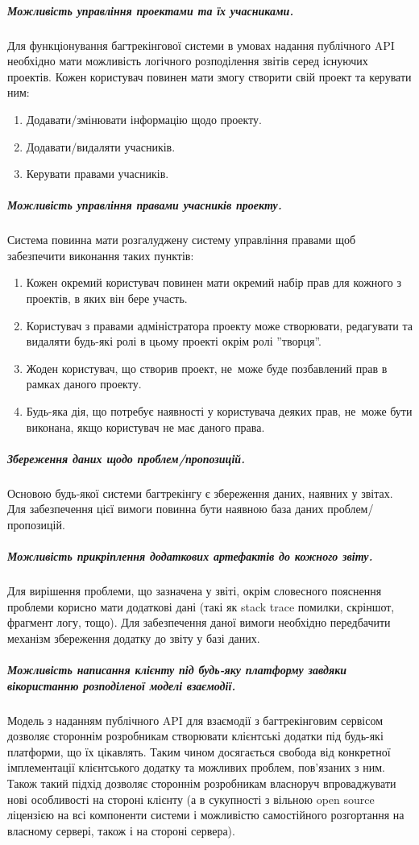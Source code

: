 \documentclass[../main.tex]{subfiles}
\begin{document}
	\subparagraph{Можливість управління проектами та їх учасниками.}
		Для функціонування багтрекінгової системи в умовах надання публічного API необхідно мати можливість логічного розподілення звітів серед існуючих проектів. Кожен користувач повинен мати змогу створити свій проект та керувати ним:
		\begin{enumerate}
			\item Додавати/змінювати інформацію щодо проекту.
			\item Додавати/видаляти учасників.
			\item Керувати правами учасників.
		\end{enumerate}
	
	\subparagraph{Можливість управління правами учасників проекту.}
		Система повинна мати розгалуджену систему управління правами щоб забезпечити виконання таких пунктів:
		\begin{enumerate}
			\item Кожен окремий користувач повинен мати окремий набір прав для кожного з проектів, в яких він бере участь.
			\item Користувач з правами адміністратора проекту може створювати, редагувати та видаляти будь-які ролі в цьому проекті окрім ролі ''творця''.
			\item Жоден користувач, що створив проект, не~може буде позбавлений прав в рамках даного проекту.
			\item Будь-яка дія, що потребує наявності у користувача деяких прав, не~може бути виконана, якщо користувач не має даного права.
		\end{enumerate}
	
	\subparagraph{Збереження даних щодо проблем/пропозицій.}
		Основою будь-якої системи багтрекінгу є збереження даних, наявних у звітах. Для забезпечення цієї вимоги повинна бути наявною база даних проблем/пропозицій.
	
	\subparagraph{Можливість прикріплення додаткових артефактів до кожного звіту.}
		Для вирішення проблеми, що зазначена у звіті, окрім словесного пояснення проблеми корисно мати додаткові дані (такі як stack trace помилки, скріншот, фрагмент логу, тощо). Для забезпечення даної вимоги необхідно передбачити механізм збереження додатку до звіту у базі даних.
	
	\subparagraph{Можливість написання клієнту під будь-яку платформу завдяки вікористанню розподіленої моделі взаємодії.}
		Модель з наданням публічного API для взаємодії з багтрекінговим сервісом дозволяє стороннім розробникам створювати клієнтські додатки під будь-які платформи, що їх цікавлять. Таким чином досягається свобода від конкретної імплементації клієнтського додатку та можливих проблем, пов'язаних з ним. Також такий підхід дозволяє стороннім розробникам власноруч впроваджувати нові особливості на стороні клієнту (а в сукупності з вільною open source ліцензією на всі компоненти системи і можливістю самостійного розгортання на власному сервері, також і на стороні сервера).
	
\end{document}
